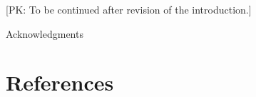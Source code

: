 \documentclass[aps,prd,amsmath,floats,floatfix, twocolumn,
superscriptaddress,nofootinbib,showpacs]{revtex4-1}
\newcommand{\prayush}{\textcolor{red!40!black}}
\begin{document}
\prayush{[PK: To be continued after revision of the introduction.]}

\begin{acknowledgments}
Acknowledgments
\end{acknowledgments}

\section*{References}

\end{document}
